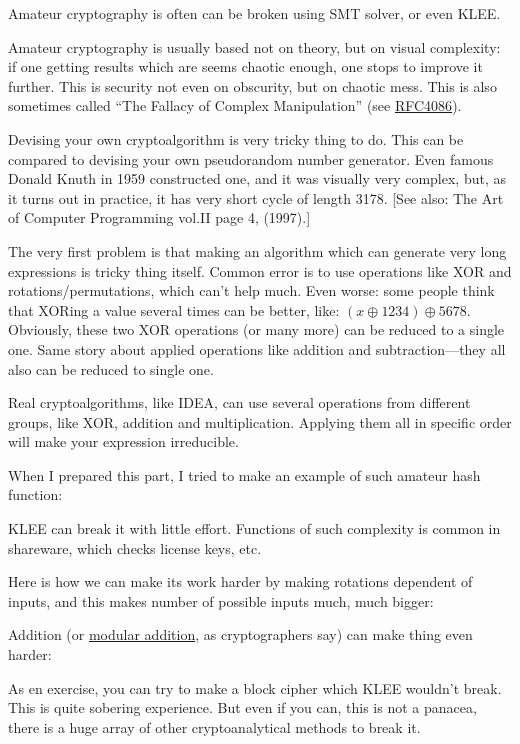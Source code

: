 Amateur cryptography is often can be broken using SMT solver, or even KLEE.

Amateur cryptography is usually based not on theory, but on visual complexity: if one getting results which are seems chaotic enough, one stops to improve it further.
This is security not even on obscurity, but on chaotic mess.
This is also sometimes called ``The Fallacy of Complex Manipulation'' (see \href{https://tools.ietf.org/html/rfc4086}{RFC4086}).

Devising your own cryptoalgorithm is very tricky thing to do.
This can be compared to devising your own pseudorandom number generator.
Even famous Donald Knuth in 1959 constructed one, and it was visually very complex, but, as it turns out in practice, it has very short cycle of length 3178.
[See also: The Art of Computer Programming vol.II page 4, (1997).]

The very first problem is that making an algorithm which can generate very long expressions is tricky thing itself.
Common error is to use operations like XOR and rotations/permutations, which can't help much.
Even worse: some people think that XORing a value several times can be better, like: $(x \oplus 1234) \oplus 5678$.
Obviously, these two XOR operations (or many more) can be reduced to a single one.
Same story about applied operations like addition and subtraction---they all also can be reduced to single one.

Real cryptoalgorithms, like IDEA, can use several operations from different groups, like XOR, addition and multiplication.
Applying them all in specific order will make your expression irreducible.

When I prepared this part, I tried to make an example of such amateur hash function:



KLEE can break it with little effort.
Functions of such complexity is common in shareware, which checks license keys, etc.

Here is how we can make its work harder by making rotations dependent of inputs, and this makes number of possible inputs much, much bigger:



Addition (or \href{https://yurichev.com/blog/modulo/}{modular addition}, as cryptographers say) can make thing even harder:



As en exercise, you can try to make a block cipher which KLEE wouldn't break.
This is quite sobering experience.
But even if you can, this is not a panacea, there is a huge array of other cryptoanalytical methods to break it.

